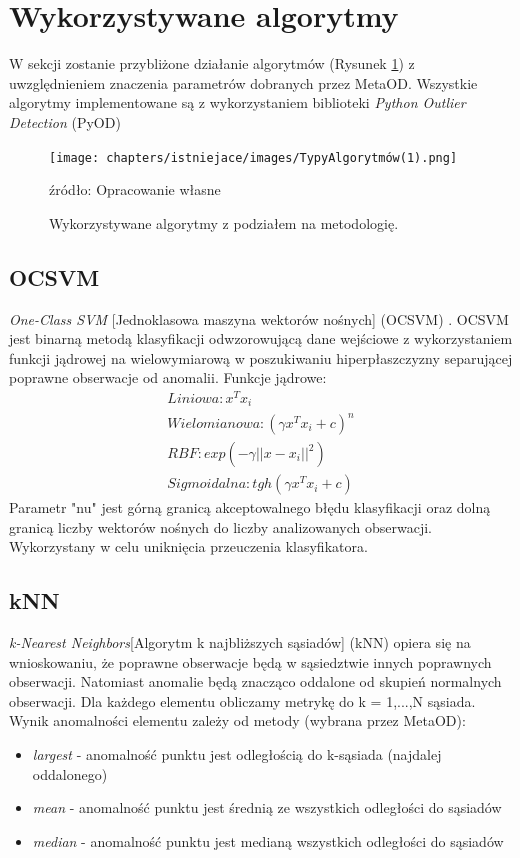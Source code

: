 \section{Wykorzystywane algorytmy}
\label{ref:Algorytmy}
W sekcji zostanie przybliżone działanie algorytmów (Rysunek \ref{fig:typy}) z uwzględnieniem znaczenia parametrów dobranych przez MetaOD.
Wszystkie algorytmy implementowane są z wykorzystaniem biblioteki \textit{Python Outlier Detection} (PyOD) \cite{zhao2019pyod}
\begin{figure}
    \centering
    \texttt{[image: chapters/istniejace/images/TypyAlgorytmów(1).png]}
    \caption{Wykorzystywane algorytmy z podziałem na metodologię.}
    \footnotesize{źródło: Opracowanie własne}
    \label{fig:typy}
\end{figure}

\subsection{OCSVM}
\textit{One-Class SVM} [Jednoklasowa maszyna wektorów nośnych] (OCSVM) \cite{ocsvm}. OCSVM jest binarną metodą klasyfikacji odwzorowującą dane wejściowe z wykorzystaniem funkcji jądrowej na wielowymiarową w poszukiwaniu hiperpłaszczyzny separującej poprawne obserwacje od anomalii.  
Funkcje jądrowe:
\begin{align*}
    Liniowa: x^Tx_i \\
    Wielomianowa: (\gamma x^Tx_i+c)^n \\
    RBF: exp(-\gamma ||x-x_i||^2) \\
    Sigmoidalna: tgh(\gamma x^Tx_i+c)
\end{align*}
Parametr "nu" jest górną granicą akceptowalnego błędu klasyfikacji oraz dolną granicą liczby wektorów nośnych do liczby analizowanych obserwacji. Wykorzystany w celu uniknięcia przeuczenia klasyfikatora. 
\label{eq:funjadro}

\subsection{kNN}
\label{knn}
\textit{k-Nearest Neighbors}[Algorytm k najbliższych sąsiadów] (kNN) \cite{knn} opiera się na wnioskowaniu, że poprawne obserwacje będą w sąsiedztwie innych poprawnych obserwacji. Natomiast anomalie będą znacząco oddalone od skupień normalnych obserwacji. Dla każdego elementu obliczamy metrykę do k = 1,...,N sąsiada. Wynik anomalności elementu zależy od metody (wybrana przez MetaOD):
\begin{itemize}
    \item \textit{largest} - anomalność punktu jest odległością do k-sąsiada (najdalej oddalonego)
    \item \textit{mean} - anomalność punktu jest średnią ze wszystkich odległości do sąsiadów
    \item \textit{median} - anomalność punktu jest medianą wszystkich odległości do sąsiadów
\end{itemize}

